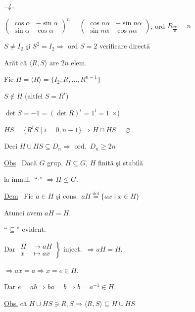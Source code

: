 \documentclass[12pt]{article}
\begin{document}
\begin{center}
\textit{--4--}
\end{center}

\noindent{} \quad $\begin{pmatrix}\cos\alpha & -\sin\alpha\\ \sin\alpha & \cos\alpha\end{pmatrix}^{\!n} = \begin{pmatrix}\cos n\alpha & -\sin n\alpha\\ \sin n\alpha & \cos n\alpha\end{pmatrix}$, \quad ord $R_{\frac{2\pi}{n}} = n$

\bigskip
\noindent $S\neq I_2$ şi $S^2=I_2 \Rightarrow$ ord $S=2$ \hfill verificare directă

\bigskip
\bigskip
\noindent Arăt că $\langle R,S\rangle$ are $2n$ elem.

\noindent Fie $H=\langle R\rangle = \{I_2,R,\ldots,R^{n-1}\}$

\noindent $S\notin H$ (altfel $S=R^i$)

\noindent $\det S = -1 = (\det R)^i = 1^i = 1$ \quad $\times$)

\bigskip
\noindent $HS = \{R^iS \mid i=\overline{0,n-1}\} \Rightarrow H\cap HS=\varnothing$

\noindent Deci $H\cup HS \subseteq D_n \Rightarrow$ ord.\ $D_n\geq 2n$

\bigskip
\noindent\underline{Obs} \ Dacă $G$ grup, $H\subseteq G$, $H$ finită şi stabilă

\noindent la înmul.\ ``$\cdot$'' $\Rightarrow H\leq G$.

\bigskip
\noindent\underline{Dem} \ Fie $a\in H$ şi cons.\ $aH \overset{\text{def}}{=} \{ax \mid x\in H\}$

\noindent Atunci avem $aH=H$.

\noindent ``$\subseteq$'' evident.

\bigskip
\noindent Dar $\left.\begin{aligned} H&\to aH\\ x&\mapsto ax \end{aligned}\right\}$ inject.\ $\Rightarrow aH=H$.

\bigskip
\noindent $\Rightarrow ax=a \Rightarrow x=e\in H.$

\noindent Dar $e=ab \Rightarrow ba=b \Rightarrow b=a^{-1}\in H.$

\bigskip
\noindent\underline{Obs.} că $H\cup HS \ni R,S \Rightarrow \langle R,S\rangle \subseteq H\cup HS$
\end{document}
